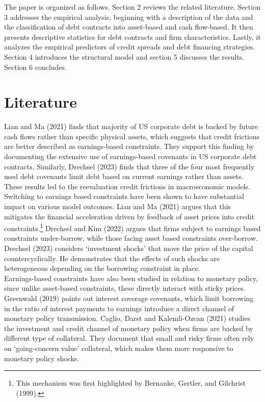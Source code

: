 \documentclass[12pt]{article}
\begin{document}
The paper is organized as follows. Section 2 reviews the related literature. Section 3 addresses the empirical analysis, beginning with a description of the data and the classification of debt contracts into asset-based and cash flow-based. It then presents descriptive statistics for debt contracts and firm characteristics. Lastly, it analyzes the empirical predictors of credit spreads and debt financing strategies. Section 4 introduces the structural model and section 5 discusses the results. Section 6 concludes.

\section{Literature \label{sec:literature}} 
Lian and Ma (2021) finds that majority of US corporate debt is backed by future cash flows rather than specific physical assets, which suggests that credit frictions are better described as earnings-based constraints. They support this finding by documenting the extensive use of earnings-based covenants in US corporate debt contracts. Similarly, Drechsel (2023) finds that three of the four most frequently used debt covenants limit debt based on current earnings rather than assets. \vspace{3mm} \\
These results led to the reevaluation credit frictions in macroeconomic models. Switching to earnings based constraints have been shown to have substantial impact on various model outcomes. Lian and Ma (2021) argues that this mitigates the financial acceleration driven by feedback of asset prices into credit constraints.\footnote{This mechanism was first highlighted by Bernanke, Gertler, and Gilchrist (1999).} Drechsel and Kim (2022) argues that firms subject to earnings based constraints under-borrow, while those facing asset based constraints over-borrow. Drechsel (2023) considers `investment shocks' that move the price of the capital countercyclically. He demonstrates that the effects of such shocks are heterogeneous depending on the borrowing constraint in place.  \vspace{3mm} \\
Earnings-based constraints have also been studied in relation to monetary policy, since unlike asset-based constraints, these directly interact with sticky prices. Greenwald (2019) points out interest coverage covenants, which limit borrowing in the ratio of interest payments to earnings introduce a direct channel of monetary policy transmission. Caglio, Darst and Kalemli-Ozcan (2021) studies the investment and credit channel of monetary policy when firms are backed by different type of collateral. They document that small and risky firms often rely on `going-concern value' collateral, which makes them more responsive to monetary policy shocks. \vspace{3mm} \\
\end{document}
